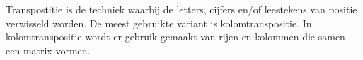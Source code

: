 Transpostitie is de techniek waarbij de letters, cijfers en/of leestekens van positie verwisseld worden. De meest gebruikte variant is kolomtranspositie. In kolomtranspositie wordt er gebruik gemaakt van rijen en kolommen die samen een matrix vormen.
